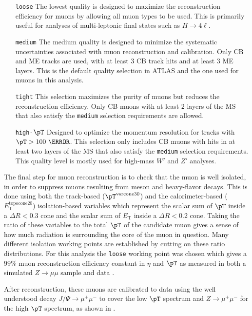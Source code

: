 \begin{enumerate}
  \item[\texttt{loose}] The lowest quality is designed to maximize the reconstruction efficiency for muons by allowing all muon types to be used.  This is primarily useful for analyses of multi-leptonic final states such as $H \rightarrow 4\ell$.
  \item[\texttt{medium}] The medium quality is designed to minimize the systematic uncertainties associated with muon reconstruction and calibration.  Only CB and ME tracks are used, with at least 3 CB track hits and at least 3 ME layers.  This is the default quality selection in ATLAS and the one used for muons in this analysis.
  \item[\texttt{tight}] This selection maximizes the purity of muons but reduces the reconstruction efficiency. Only CB muons with at least 2 layers of the MS that also satisfy the \texttt{medium} selection requirements are allowed.
  \item[\texttt{high-$\pT$}] Designed to optimize the momentum resolution for tracks with $\pT > 100~\GeV$.  This selection only includes CB muons with hits in at least two layers of the MS that also satisfy the \texttt{medium} selection requirements. This quality level is mostly used for high-mass $W'$ and $Z'$ analyses.
\end{enumerate}

The final step for muon reconstruction is to check that the muon is well
isolated, in order to suppress muons resulting from meson and heavy-flavor decays. This
is done using both the track-based ($\pT^{\text{varcone}30}$) and the
calorimeter-based ($E_{\text{T}}^{\text{topocone}20}$) isolation-based variables which
represent the scalar sum of $\pT$ inside a $\Delta R < 0.3$ cone and the
scalar sum of $E_{\text{T}}$ inside a $\Delta R < 0.2$ cone.  Taking the ratio of
these variables to the total $\pT$ of the candidate muon gives a sense of
how much radiation is surrounding the core of the muon in question. Many
different isolation working points are established by cutting on these ratio
distributions. For this analysis the \texttt{loose} working point was chosen which gives a
$99\%$ muon reconstruction efficiency constant in $\eta$ and $\pT$ as
measured in both a simulated $Z \rightarrow \mu\mu$ sample and data \cite{Aad:2016jkr}.

After reconstruction, these muons are calibrated to data using the well understood
decay $J/\Psi \rightarrow \mu^{+}\mu^{-}$ to cover the low $\pT$ spectrum and
$Z \rightarrow \mu^{+}\mu^{-}$ for the high $\pT$ spectrum, as shown in .

